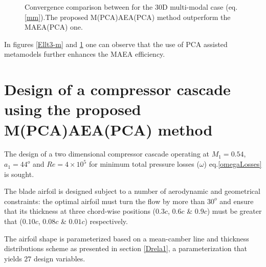 \begin{figure}[h!]
\begin{minipage}[b]{1\linewidth}
 \centering
\end{minipage}
\caption{Convergence comparison between for the 30D multi-modal case (eq. \ref{mm}).The proposed M(PCA)AEA(PCA) method outperform the MAEA(PCA) one.} 
\label{mmt3m}
\end{figure}

In figures \ref{Ellt3-m} and \ref{mmt3m} one can observe that the use of PCA assisted metamodels further enhances the MAEA efficiency.


\section{Design of a compressor cascade using the proposed M(PCA)AEA(PCA) method}


The design of a two dimensional compressor cascade operating at $M_1=0.54$, $a_1=44^o$ and $Re=4\times10^5$ for minimum total pressure losses ($\omega$) eq.\ref{omegaLosses} is sought. 

The blade airfoil is designed subject to a number of aerodynamic and geometrical constraints: the optimal airfoil must turn the flow by more than $30^o$ and ensure that its thickness at three chord-wise positions ($0.3c$, $0.6c$ \& $0.9c$) must be greater that ($0.10c$, $0.08c$ \& $0.01c$)  respectively.     

The airfoil shape is parameterized based on a mean-camber line and thickness distributions scheme as presented in section \ref{Drela1}, a parameterization that yields $27$ design variables.

